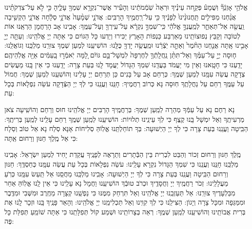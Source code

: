 \documentclass[twoside, openany, parskip=half, 11pt]{book}
\begin{document}
 
 אֱלֹהַ֥י אָזְנְֿךָ֘ וּֽשֲׁמָע֒ פְּקַ֣חה עֵינֶ֗יךָ וּרְאֵה֙ שֹֽׁמְֿמֹתֵ֔ינוּ וְהָעִ֕יר אֲשֶׁר־נִקְרָ֥א שִׁמְךָ֖ עָלֶ֑יהָ כִּ֣י לֹ֣א עַל־צִדְקֹתֵ֗ינוּ אֲנַ֨חְנוּ מַפִּילִ֤ים תַּֽחֲנוּנֵ֨ינוּ֙ לְפָנֶ֔יךָ כִּ֖י עַל־רַֽחֲמֶ֥יךָ הָרַבִּֽים: אֲדֹנָ֤י שְׁמָ֨עָה֙ אֲדֹנָ֣י סְלָ֔חָה אֲדֹנָ֛י הַקְשִׁ֥יבָה וַֽעֲשֵׂ֖ה אַל־תְּאַחַ֑ר לְמַֽעֲנְךָ֣ אֱלֹהַ֔י כִּֽי־שִׁמְךָ֣ נִקְרָ֔א עַל־עִֽירְךָ֖ וְעַל־עַמֶּֽךָ: אָבִֽינוּ אָב הָרַחֲמָן הַרְאֵֽנוּ אוֹת לְטוֹבָה וְקַבֵּץ נְפוּצוֹתֵֽינוּ מֵאַרְבַּע כַּנְפוֹת הָאָרֶץ יַכִּירוּ וְיֵדְעוּ כָּל הַגּוֹיִם כִּי אַתָּה יְיָ אֱלֹהֵֽינוּ: 
 וְעַתָּ֥ה יְיָ֖ אָבִ֣ינוּ אָֽתָּה אֲנַ֤חְנוּ הַחֹ֨מֶר֙ וְאַתָּ֣ה יֹֽצְֿרֵ֔נוּ וּמַֽעֲשֵׂ֥ה יָדְךָ֖ כֻּלָּֽנוּ: הוֹשִׁיעֵֽנוּ לְמַעַן שְׁמֶךָ צוּרֵֽנוּ מַלְכֵּֽנוּ וְגוֹאֲלֵֽנוּ:
ח֧וּסָה יְיָ֣ עַל־עַמֶּ֗ךָ וְאַל־תִּתֵּ֨ן נַֽחֲלָֽתְֿךָ֤ לְחֶרְפָּה֙ לִמְשָׁל־בָּ֣ם גּוֹיִ֔ם לָ֚מָּה יֹֽאמְֿר֣וּ בָֽעַמִּ֔ים אַיֵּ֖ה אֱלֹֽהֵיהֶֽם׃ יָדַֽעְנוּ כִּי חָטָֽאנוּ וְאֵין מִי יַעֲמֹד בַּעֲדֵֽנוּ שִׁמְךָ הַגָּדוֹל יַעֲמָד לָֽנוּ בְּעֵת צָרָה: יָדַֽעְנוּ כִּי אֵין בָּֽנוּ מַעֲשִׂים צְדָקָה עֲשֵׂה עִמָּֽנוּ לְמַעַן שְׁמֶֽךָ: כְּרַחֵם אָב עַל בָּנִים כֵּן תְּרַחֵם יְיָ עָלֵינוּ וְהוֹשִׁעֵֽנוּ לְמַעַן שְׁמֶךָ: חֲמוֹל עַל עַמֶּֽךָ רַחֵם עַל נַחֲלָתֶֽךָ חֽוּסָה נָּא כְּרוֹב רַחֲמֶיךָ: חָנֵּֽנוּ וַעֲנֵֽנוּ כִּי לְךָ יְיָ הַצְּֿדָקָה עֹשֵׂה נִפְלָאוֹת בְּכָל עֵת:



 נָא רַחֶם נָא עַל עַמְּֿךָ מְהֵרָה לְמַֽעַן שְׁמֶךָ: בְּרַחֲמֶֽיךָ הָרַבִּים יְיָ אֱלֹהֵֽינוּ חוּס וְרַחֵם וְהוֹשִֽׁיעָה צֹאן מַרְעִיתֶֽךָ וְאַל יִמְשָׁל בָּֽנוּ קֶֽצֶף כִּי לְךָ עֵינֵֽינוּ תְלוּיוֹת: הוֹשִׁיעֵֽנוּ לְמַֽעַן שְׁמֶֽךָ רַחֵם עָלֵֽינוּ לְמַֽעַן בְּרִיתֶֽךָ: הַבִּֽיטָה וַעֲנֵֽנוּ בְּעֵת צָרָה כִּי לְךָ יְיָ הַיְשׁוּעָה: בְּךָ תוֹחַלְתֵּֽנוּ אֱלֽוֹהַּ סְלִיחוֹת אָנָּא סְלַח נָא אֵל טוֹב וְסַלָח כִּי אֵל מֶֽלֶךְ חַנּוּן וְרַחוּם אַֽתָּה:

 מֶֽלֶךְ חַנּוּן וְרַחוּם זְכוֹר וְהַבֵּט לִבְרִית בֵּין הַבְּֿתָרִים וְתֵרָאֶה לְפָנֶֽיךָ עֲקֵדַת יָחִיד לְמַעַן יִשְׂרָאֵל: אָבִֽינוּ מַלְכֵּֽנוּ חָנֵּֽנוּ וְעֲנֵֽנוּ כִּי שִׁמְךָ הַגָּדוֹל נִקְרָא עָלֵֽינוּ: עֹשֵׂה נִפְלָאוֹת בְּכָל עֵת עֲשֵׂה עִמָּֽנוּ כְּחַסְדֶּֽךָ: חַנּוּן וְרַחוּם הַבִּֽיטָה וַעֲנֵֽנוּ בְּעֵת צָרָה כִּי לְךָ יְיָ הַיְשׁוּעָה: אָבִֽינוּ מַלְכֵּֽנוּ מַחֲסֵֽנוּ אַל תַּֽעַשׂ עִמָּֽנוּ כְּרֹֽעַ מַעֲלָלֵֽינוּ: זְכֹר רַחֲמֶֽיךָ יְיָ וְחֲסָדֶֽיךָ וּכְרֹב טוּבְֿךָ הוֹשִׁיעֵֽנוּ וַחֲמָל נָא עָלֵֽינוּ כִּי אֵין לָֽנוּ אֱלֽוֹהַּ אַחֵר מִבַּלְעָדֶיךָ צוּרֵֽנוּ: אַל תַּעַזְבֵֽנוּ יְיָ אֱלֹהֵֽינוּ וְאַל תִּרְחַק מִמֶּנּוּ כִּי נַפְשֵֽׁנוּ קְצָרָה מֵחֶֽרֶב וּמִשְּׁבִי וּמִדֶּֽבֶר וּמִמַּגֵּפָה וּמִכָּל צָרָה וְיָגוֹן: הַצִּילֵֽנוּ כִּי לְךָ קִוִּֽינוּ וְאַל תַּכְלִימֵֽנוּ יְיָ אֱלֹהֵֽינוּ: וְהָאֵר פָּנֶֽיךָ בָּֽנוּ וּזְכָר לָֽנוּ אֶת בְּרִית אֲבוֹתֵֽינוּ וְהוֹשִׁיעֵֽנוּ לְמַֽעַן שְׁמֶֽךָ: רְאֵה בְצָרוֹתֵֽינוּ וּשְׁמַע קוֹל תְּפִלָּתֵֽנוּ כִּי אַתָּה שׁוֹמֵֽעַ תְּפִלַּת כָּל פֶּה:
\end{document}
